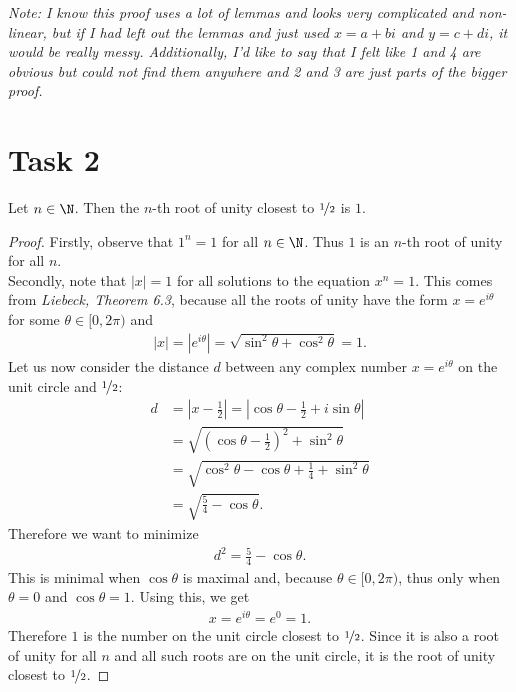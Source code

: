 \documentclass{article}
\begin{document}
\emph{Note: I know this proof uses a lot of lemmas and looks very complicated and non-linear, but if I had left out the lemmas and just used $x=a+bi$ and $y=c+di$, it would be really messy. Additionally, I'd like to say that I felt like 1 and 4 are obvious but could not find them anywhere and 2 and 3 are just parts of the bigger proof.}
\section*{Task 2}
\begin{claim}
  Let $n\in\N$. Then the $n$-th root of unity closest to $\nicefrac{1}{2}$ is $1$.
\end{claim}
\begin{proof}
  Firstly, observe that $1^n=1$ for all $n\in\N$. Thus $1$ is an $n$-th root of unity for all $n$.\\
  Secondly, note that $|x|=1$ for all solutions to the equation $x^n=1$. This comes from \emph{Liebeck, Theorem 6.3}, because all the roots of unity have the form $x=e^{i\theta}$ for some $\theta\in[0,2\pi)$ and
  \begin{align*}
    |x|=|e^{i\theta}|=\sqrt{\sin^2\theta+\cos^2\theta}=1.
  \end{align*}
  Let us now consider the distance $d$ between any complex number $x=e^{i\theta}$ on the unit circle and $\nicefrac{1}{2}$:
  \begin{align*}
    d & =\left|x-\frac{1}{2}\right|
    =\left|\cos\theta-\frac{1}{2}+i\sin\theta\right|                \\
      & =\sqrt{\left(\cos\theta -\frac{1}{2}\right)^2+\sin^2\theta} \\
      & =\sqrt{\cos^2\theta-\cos\theta+\frac{1}{4}+\sin^2\theta}    \\
      & =\sqrt{\frac{5}{4}-\cos\theta}.
  \end{align*}
  Therefore we want to minimize
  \begin{align*}
    d^2=\frac{5}{4}-\cos\theta.
  \end{align*}
  This is minimal when $\cos\theta$ is maximal and, because $\theta\in[0,2\pi)$, thus only when $\theta=0$ and $\cos \theta = 1$.
  Using this, we get
  \begin{align*}
    x=e^{i\theta}=e^{0}=1.
  \end{align*}
  Therefore $1$ is the number on the unit circle closest to $\nicefrac{1}{2}$.
  Since it is also a root of unity for all $n$ and all such roots are on the unit circle, it is the root of unity closest to $\nicefrac{1}{2}$.
\end{proof}
\end{document}
